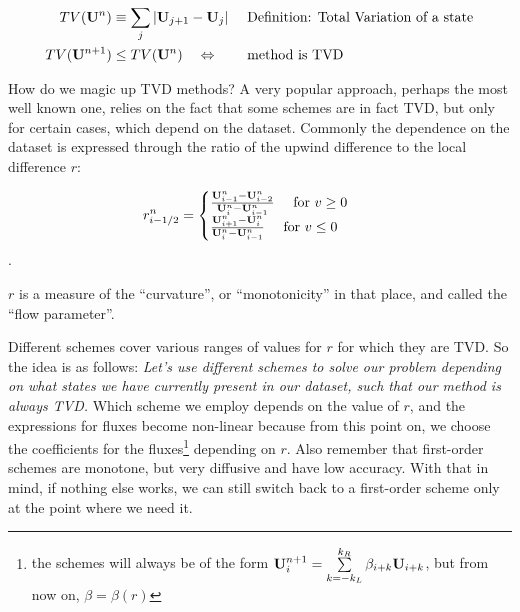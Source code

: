 \begin{align}
	TV(\U^n) &\equiv \sum_j | \U_{j+1} - \U_j | && \text{ Definition: Total Variation of a state}\\
	TV(\U^{n+1}) &\leq TV(\U^n) \quad \Leftrightarrow && \text{ method is TVD }
\end{align}


How do we magic up TVD methods?
A very popular approach, perhaps the most well known one, relies on the fact that some schemes are in fact TVD, but only for certain cases, which depend on the dataset.
Commonly the dependence on the dataset is expressed through the ratio of the upwind difference to the local difference $r$:

\begin{align*}
	r^n_{i-1/2} &= \begin{cases}
		\frac{\mathbf{U}_{i-1}^n - \mathbf{U}_{i-2}^n}{\mathbf{U}_{i}^n - \mathbf{U}_{i-1}^n} 	\quad \text{ for } v  \geq 0 \\
		\frac{\mathbf{U}_{i+1}^n - \mathbf{U}_{i}^n}{\mathbf{U}_{i}^n - \mathbf{U}_{i-1}^n} 	\quad \text{ for } v  \leq 0 \\
	\end{cases}
\end{align*}.

$r$ is  a measure of the ``curvature'', or ``monotonicity'' in that place, and called the ``flow parameter''.

Different schemes cover various ranges of values for $r$ for which they are TVD.
So the idea is as follows:
\emph{Let's use different schemes to solve our problem depending on what states we have currently present in our dataset, such that our method is always TVD.}
Which scheme we employ depends on the value of $r$, and the expressions for fluxes become non-linear because from this point on, we choose the coefficients for the fluxes\footnote{	
	the schemes will always be of the form $\U^{n+1}_i = \sum_{k = -k_L}^{k_R} \beta_{i+k} \U_{i+k}$, but from now on, $\beta = \beta(r)$
} depending on $r$.
Also remember that first-order schemes are monotone, but very diffusive and have low accuracy.
With that in mind, if nothing else works, we can still switch back to a first-order scheme only at the point where we need it.


















